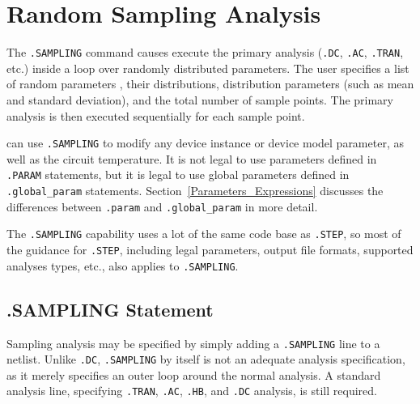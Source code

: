 

\clearpage
\section{Random Sampling Analysis}
\label{SAMPLING_Analysis}
\label{sampling_Overview}
  

The \verb|.SAMPLING| command causes \Xyce{} execute the primary analysis (\verb|.DC|,
\verb|.AC|, \verb|.TRAN|, etc.) inside a loop over randomly distributed parameters.  
The user specifies a list of random parameters , their distributions, distribution 
parameters (such as mean and standard deviation), and the total number of 
sample points.  The primary analysis is then executed sequentially for each sample point.

\Xyce{}  can use \verb|.SAMPLING| to modify any device instance or device
model parameter, as well as the circuit temperature.  It is not legal to use 
parameters defined in \texttt{.PARAM} statements, but it is legal to use global 
parameters defined in \texttt{.global\_param} statements.  
Section~\ref{Parameters_Expressions} discusses the differences 
between \texttt{.param} and \texttt{.global\_param} in more detail.

The \verb|.SAMPLING| capability uses a lot of the same code base as \verb|.STEP|, 
so most of the guidance for \verb|.STEP|, including legal parameters, output 
file formats, supported analyses types, etc., also applies to \verb|.SAMPLING|.

\subsection{.SAMPLING Statement}
\label{sampling_statement}
Sampling analysis may be specified by simply adding a \verb|.SAMPLING| 
line to a netlist.  Unlike \verb|.DC|, \verb|.SAMPLING| by itself is not an 
adequate analysis specification, as it merely specifies an outer loop around the 
normal analysis.  A standard analysis line, specifying \verb|.TRAN|, \verb|.AC|, \verb|.HB|, 
and \verb|.DC| analysis, is still required.

